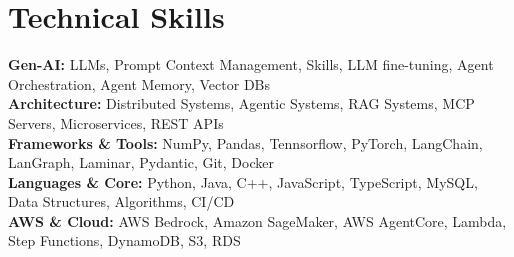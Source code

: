 
\section{Technical Skills}
    \begin{itemize}[leftmargin=0.15in, label={}]
	\small{\item{
    \textbf{Gen-AI:} LLMs, Prompt Context Management, Skills, LLM fine-tuning, Agent Orchestration, Agent Memory, Vector DBs  \\[4pt]
    \textbf{Architecture:} Distributed Systems, Agentic Systems, RAG Systems, MCP Servers, Microservices, REST APIs\\[4pt]
    \textbf{Frameworks \& Tools:} NumPy, Pandas, Tennsorflow, PyTorch, LangChain, LanGraph, Laminar, Pydantic, Git, Docker \\[4pt]
    \textbf{Languages \& Core:} Python, Java, C++, JavaScript, TypeScript, MySQL, Data Structures, Algorithms, CI/CD \\[4pt]
      \textbf{AWS \& Cloud:} AWS Bedrock, Amazon SageMaker, AWS AgentCore, Lambda, Step Functions, DynamoDB, S3, RDS  \\[4pt]
    }}
    \end{itemize}